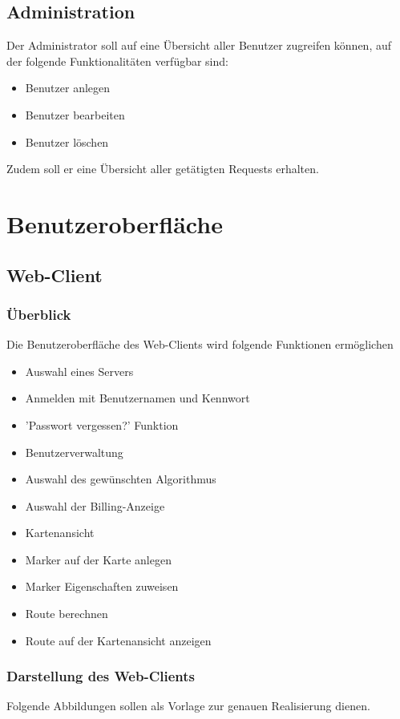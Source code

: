 \documentclass[a4paper,10pt,titlepage]{article}
\begin{document}
\subsection{Administration}
Der Administrator soll auf eine Übersicht aller Benutzer zugreifen können, auf der folgende Funktionalitäten verfügbar sind:
\begin{itemize}
 \item Benutzer anlegen
 \item Benutzer bearbeiten
 \item Benutzer löschen
\end{itemize}

Zudem soll er eine Übersicht aller getätigten Requests erhalten.

\clearpage
\section{Benutzeroberfläche}
\subsection{Web-Client}
\subsubsection{Überblick}
Die Benutzeroberfläche des Web-Clients wird folgende Funktionen ermöglichen
\begin{itemize}
\item Auswahl eines Servers
\item Anmelden mit Benutzernamen und Kennwort
\item ’Passwort vergessen?’ Funktion
\item Benutzerverwaltung
\item Auswahl des gewünschten Algorithmus
\item Auswahl der Billing-Anzeige 
\item Kartenansicht
\item Marker auf der Karte anlegen
\item Marker Eigenschaften zuweisen
\item Route berechnen
\item Route auf der Kartenansicht anzeigen
\end{itemize}
\subsubsection{Darstellung des Web-Clients}
Folgende Abbildungen sollen als Vorlage zur genauen Realisierung dienen.
\end{document}
